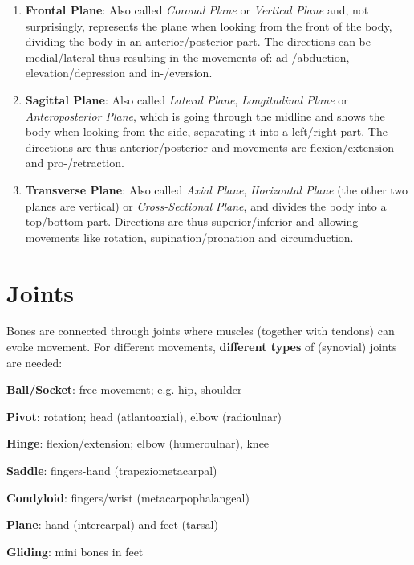 \begin{enumerate}
    \item \textbf{Frontal Plane}: Also called \textit{Coronal Plane} or \textit{Vertical Plane} and, not surprisingly, represents the plane when looking from the front of the body, dividing the body in an anterior/posterior part.
    The directions can be medial/lateral thus resulting in the movements of: ad-/abduction, elevation/depression and in-/eversion.
    \item \textbf{Sagittal Plane}: Also called \textit{Lateral Plane}, \textit{Longitudinal Plane} or \textit{Anteroposterior Plane}, which is going through the midline and shows the body when looking from the side, separating it into a left/right part.
    The directions are thus anterior/posterior and movements are flexion/extension and pro-/retraction.
    \item \textbf{Transverse Plane}: Also called \textit{Axial Plane}, \textit{Horizontal Plane} (the other two planes are vertical) or \textit{Cross-Sectional Plane}, and divides the body into a top/bottom part.
    Directions are thus superior/inferior and allowing movements like rotation, supination/pronation and circumduction.
\end{enumerate}

\section{Joints}\label{sec:joints}

Bones are connected through joints where muscles (together with tendons) can evoke movement.
For different movements, \textbf{different types} of (synovial) joints are needed:

\begin{itemize*}
    \item \textbf{Ball/Socket}: free movement; e.g. hip, shoulder
    \item \textbf{Pivot}: rotation; head (atlantoaxial), elbow (radioulnar)
    \item \textbf{Hinge}: flexion/extension; elbow (humeroulnar), knee
    \item \textbf{Saddle}: fingers-hand (trapeziometacarpal)
    \item \textbf{Condyloid}: fingers/wrist (metacarpophalangeal)
    \item \textbf{Plane}: hand (intercarpal) and feet (tarsal)
    \item \textbf{Gliding}: mini bones in feet
\end{itemize*}
